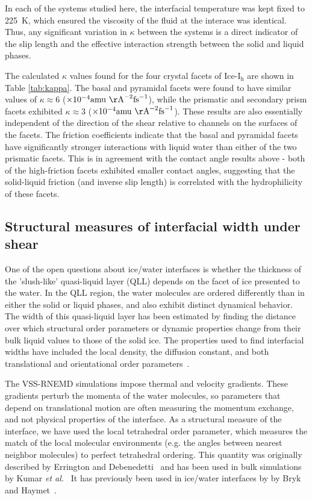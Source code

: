 In each of the systems studied here, the interfacial temperature was
kept fixed to 225~K, which ensured the viscosity of the fluid at the
interace was identical. Thus, any significant variation in $\kappa$
between the systems is a direct indicator of the slip length and the
effective interaction strength between the solid and liquid phases.

The calculated $\kappa$ values found for the four crystal facets of
Ice-I$_\mathrm{h}$ are shown in Table \ref{tab:kappa}. The basal and
pyramidal facets were found to have similar values of $\kappa \approx
6$ ($\times 10^{-4} \mathrm{amu~\AA}^{-2}\mathrm{fs}^{-1}$), while the
prismatic and secondary prism facets exhibited $\kappa \approx 3$
($\times 10^{-4} \mathrm{amu~\AA}^{-2}\mathrm{fs}^{-1}$). These
results are also essentially independent of the direction of the shear
relative to channels on the surfaces of the facets.  The friction
coefficients indicate that the basal and pyramidal facets have
significantly stronger interactions with liquid water than either of
the two prismatic facets.  This is in agreement with the contact angle
results above - both of the high-friction facets exhibited smaller
contact angles, suggesting that the solid-liquid friction (and inverse
slip length) is correlated with the hydrophilicity of these facets.

\subsection{Structural measures of interfacial width under shear}
One of the open questions about ice/water interfaces is whether the
thickness of the 'slush-like' quasi-liquid layer (QLL) depends on the
facet of ice presented to the water.  In the QLL region, the water
molecules are ordered differently than in either the solid or liquid
phases, and also exhibit distinct dynamical behavior.  The width of
this quasi-liquid layer has been estimated by finding the distance
over which structural order parameters or dynamic properties change
from their bulk liquid values to those of the solid ice.  The
properties used to find interfacial widths have included the local
density, the diffusion constant, and both translational and
orientational order
parameters~\cite{Karim1988,Karim1990,Hayward2001,Hayward2002,Bryk2002,Gay2002,Louden2013a}.

The VSS-RNEMD simulations impose thermal and velocity gradients.
These gradients perturb the momenta of the water molecules, so
parameters that depend on translational motion are often measuring the
momentum exchange, and not physical properties of the interface.  As a
structural measure of the interface, we have used the local
tetrahedral order parameter, which measures the match of the local
molecular environments (e.g. the angles between nearest neighbor
molecules) to perfect tetrahedral ordering.  This quantity was
originally described by Errington and Debenedetti~\cite{Errington2001}
and has been used in bulk simulations by Kumar \textit{et
  al.}~\cite{Kumar2009} It has previously been used in ice/water
interfaces by by Bryk and Haymet~\cite{Bryk2004b}.

